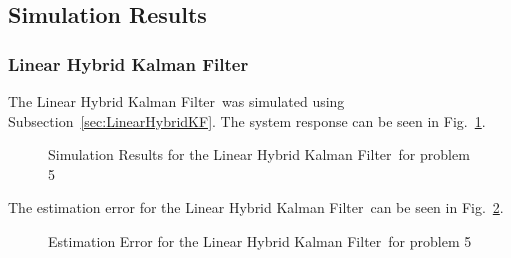 \documentclass[]{article}
\newcommand{\KF}{Kalman Filter}
\newcommand{\subsectionname}{Subsection}
\renewcommand{\figurename}{Fig.}
\begin{document}
	
	\subsection{Simulation Results}
		\subsubsection{Linear Hybrid \KF}
		The Linear Hybrid \KF \ was simulated using \subsectionname \ \ref{sec:LinearHybridKF}. The system response can be seen in \figurename \ \ref{fig:pblm5resultslin}.
		\begin{figure}[h]
			\centering
			\caption{Simulation Results for the Linear Hybrid \KF \ for problem 5}
			\label{fig:pblm5resultslin}
		\end{figure}
	
	\newpage
		The estimation error for the Linear Hybrid \KF \ can be seen in \figurename \ \ref{fig:pblm5esterrorlin}.\\
		\begin{figure}[h]
			\centering
			\caption{Estimation Error for the Linear Hybrid \KF \ for problem 5}
			\label{fig:pblm5esterrorlin}
		\end{figure}
	
\end{document}
